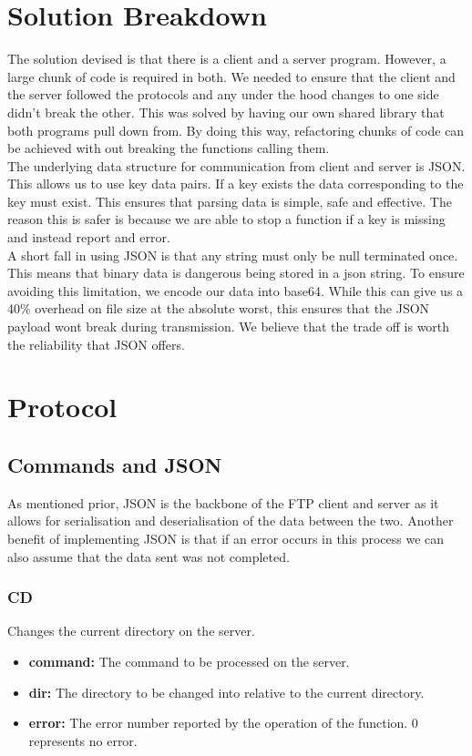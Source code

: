 \documentclass{article}
\begin{document}
\section{Solution Breakdown}
The solution devised is that there is a client and a server program. However, a large chunk of code is required in both. We needed to ensure that the client and the server followed the protocols and any under the hood changes to one side didn't break the other. This was solved by having our own shared library that both programs pull down from. By doing this way, refactoring chunks of code can be achieved with out breaking the functions calling them.\\

The underlying data structure for communication from client and server is JSON. This allows us to use key data pairs. If a key exists the data corresponding to the key must exist. This ensures that parsing data is simple, safe and effective. The reason this is safer is because we are able to stop a function if a key is missing and instead report and error.\\

A short fall in using JSON is that any string must only be null terminated once. This means that binary data is dangerous being stored in a json string. To ensure avoiding this limitation, we encode our data into base64. While this can give us a 40\% overhead on file size at the absolute worst, this ensures that the JSON payload wont break during transmission. We believe that the trade off is worth the reliability that JSON offers.

\section{Protocol}
\subsection{Commands and JSON}
As mentioned prior, JSON is the backbone of the FTP client and server as it allows for serialisation and deserialisation of the data between the two. Another benefit of implementing JSON is that if an error occurs in this process we can also assume that the data sent was not completed.
\subsubsection{CD}
Changes the current directory on the server.
\begin{itemize}
\item \textbf{command:} The command to be processed on the server.
\item \textbf{dir:} The directory to be changed into relative to the current directory. 
\item \textbf{error:} The error number reported by the operation of the function. 0 represents no error.   
\end{itemize}
\end{document}
